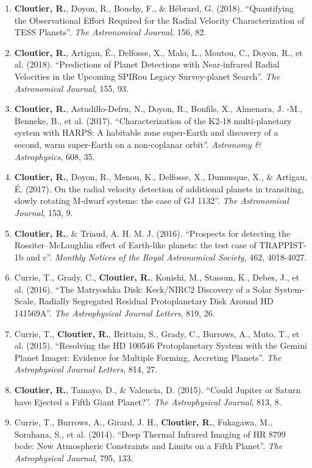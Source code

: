 \documentclass[12pt]{article}
\begin{document}
\begin{itemize}
\begin{enumerate}
\item {\bf Cloutier, R.}, Doyon, R., Bouchy, F., \& Hébrard, G. (2018). ``Quantifying the Observational Effort Required for the Radial Velocity Characterization of TESS Planets''. {\it The Astronomical Journal}, 156, 82.
\item {\bf Cloutier, R.}, Artigau, É., Delfosse, X., Malo, L., Moutou, C., Doyon, R., et al. (2018). ``Predictions of Planet Detections with Near-infrared Radial Velocities in the Upcoming SPIRou Legacy Survey-planet Search''. {\it The Astronomical Journal}, 155, 93.
\item {\bf Cloutier, R.}, Astudillo-Defru, N., Doyon, R., Bonfils, X., Almenara, J. -M., Benneke, B., et al. (2017). ``Characterization of the K2-18 multi-planetary system with HARPS: A habitable zone super-Earth and discovery of a second, warm super-Earth on a non-coplanar orbit''. {\it Astronomy \& Astrophysics}, 608, 35.
\item {\bf Cloutier, R.}, Doyon, R., Menou, K., Delfosse, X., Dumusque, X., \& Artigau, É. (2017). On the radial velocity detection of additional planets in transiting, slowly rotating M-dwarf systems: the case of GJ 1132''. {\it The Astronomical Journal}, 153, 9.
\item {\bf Cloutier, R.}, \& Triaud, A. H. M. J. (2016). ``Prospects for detecting the Rossiter–McLaughlin effect of Earth-like planets: the test case of TRAPPIST-1b and c''. {\it Monthly Notices of the Royal Astronomical Society}, 462, 4018-4027.
\item Currie, T., Grady, C., {\bf Cloutier, R.}, Konishi, M., Stassun, K., Debes, J., et al. (2016). ``The Matryoshka Disk: Keck/NIRC2 Discovery of a Solar System-Scale, Radially Segregated Residual Protoplanetary Disk Around HD 141569A''. {\it The Astrophysical Journal Letters}, 819, 26.
\item Currie, T., {\bf Cloutier, R.}, Brittain, S., Grady, C., Burrows, A., Muto, T., et al. (2015). ``Resolving the HD 100546 Protoplanetary System with the Gemini Planet Imager: Evidence for Multiple Forming, Accreting Planets''. {\it The Astrophysical Journal Letters}, 814, 27.
\item {\bf Cloutier, R.}, Tamayo, D., \& Valencia, D. (2015). ``Could Jupiter or Saturn have Ejected a Fifth Giant Planet?''. {\it The Astrophysical Journal}, 813, 8.
\item Currie, T., Burrows, A., Girard, J. H., {\bf Cloutier, R.}, Fukagawa, M., Sorahana, S., et al. (2014). ``Deep Thermal Infrared Imaging of HR 8799 bcde: New Atmospheric Constraints and Limits on a Fifth Planet''. {\it The Astrophysical Journal}, 795, 133.

\end{enumerate}
\end{itemize}
\end{document}
